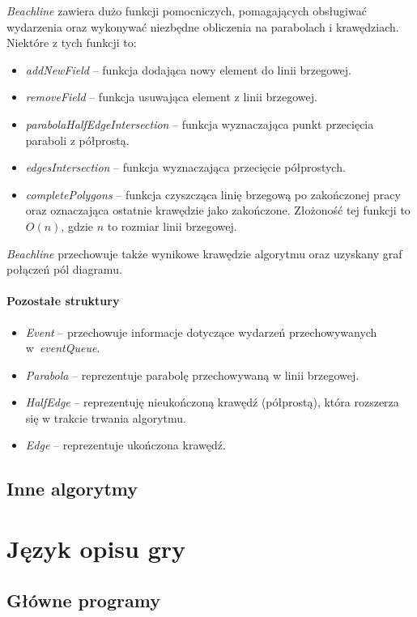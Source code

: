 \documentclass[declaration,shortabstract, inz]{iithesis}
\theoremstyle{definition} \newtheorem{definition}{Definicja}[]
\theoremstyle{plain} \newtheorem{remark}[definition]{Obserwacja}
\theoremstyle{plain} \newtheorem{theorem}[definition]{Twierdzenie}
\theoremstyle{plain} \newtheorem{example}{Przykład}[definition]
\theoremstyle{plain} \newtheorem{lemma}[definition]{Lemat}
\begin{document}
\textit{Beachline} zawiera dużo funkcji pomocniczych, pomagających obsługiwać wydarzenia oraz wykonywać niezbędne obliczenia na parabolach i krawędziach. Niektóre z tych funkcji to:

\begin{itemize}
\item \textit{addNewField} -- funkcja dodająca nowy element do linii brzegowej.
\item \textit{removeField} -- funkcja usuwająca element z linii brzegowej.
\item \textit{parabolaHalfEdgeIntersection} -- funkcja wyznaczająca punkt przecięcia paraboli z półprostą.
\item \textit{edgesIntersection} -- funkcja wyznaczająca przecięcie półprostych.
\item \textit{completePolygons} -- funkcja czyszcząca linię brzegową po zakończonej pracy oraz oznaczająca ostatnie krawędzie jako zakończone. Złożoność tej funkcji to $O(n)$, gdzie $n$ to rozmiar linii brzegowej.
\end{itemize}

\textit{Beachline} przechowuje także wynikowe krawędzie algorytmu oraz uzyskany graf połączeń pól diagramu.

\subsubsection{Pozostałe struktury}
\begin{itemize}
	\item \textit{Event} -- przechowuje informacje dotyczące wydarzeń przechowywanych w~\textit{eventQueue}.
	\item \textit{Parabola} -- reprezentuje parabolę przechowywaną w linii brzegowej.
	\item \textit{HalfEdge} -- reprezentuję nieukończoną krawędź (półprostą), która rozszerza się w trakcie trwania algorytmu.
	\item \textit{Edge} -- reprezentuje ukończona krawędź.
\end{itemize}

\section{Inne algorytmy}

\chapter{Język opisu gry}
\section{Główne programy}
\end{document}
